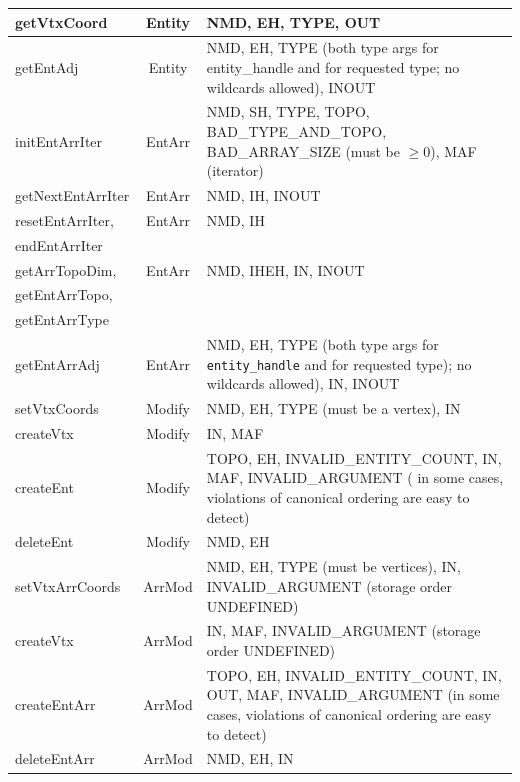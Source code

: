 \documentclass{article}
\begin{document}
\begin{longtable}{|l|c|p{3in}|}
getVtxCoord& Entity& NMD, EH, TYPE, OUT\\
\hline

getEntAdj & Entity& NMD, EH, TYPE (both type args for entity\_handle and for requested 
type; no wildcards allowed), INOUT\\
\hline

initEntArrIter& EntArr& NMD, SH, TYPE, TOPO, BAD\_TYPE\_AND\_TOPO, BAD\_ARRAY\_SIZE (must 
be $\ge 0$), MAF (iterator)\\
\hline

getNextEntArrIter& EntArr& NMD, IH, INOUT\\
\hline

resetEntArrIter, & EntArr&NMD, IH\\
endEntArrIter& &\\ 
\hline

getArrTopoDim,&  EntArr& NMD, IHEH, IN, INOUT\\
getEntArrTopo,& &\\
getEntArrType& &\\ 
\hline
  
getEntArrAdj & EntArr& NMD, EH, TYPE (both type args for {\tt entity\_handle} and for requested 
type); no wildcards allowed), IN, INOUT\\
\hline

setVtxCoords& Modify& NMD, EH, TYPE (must be a vertex), IN\\
\hline

createVtx& Modify& IN, MAF\\
\hline

createEnt& Modify& TOPO, EH, INVALID\_ENTITY\_COUNT, IN, MAF, INVALID\_ARGUMENT ( in 
some cases, violations of canonical ordering are easy to detect)\\
\hline

deleteEnt& Modify& NMD, EH\\
\hline

setVtxArrCoords& ArrMod& NMD, EH, TYPE (must be vertices), IN, INVALID\_ARGUMENT (storage 
order UNDEFINED)\\
\hline

createVtx& ArrMod& IN, MAF, INVALID\_ARGUMENT (storage order UNDEFINED)\\
\hline

createEntArr& ArrMod& TOPO, EH, INVALID\_ENTITY\_COUNT, IN, OUT, MAF, INVALID\_ARGUMENT 
(in some cases, violations of canonical ordering are easy to detect)\\
\hline

deleteEntArr& ArrMod& NMD, EH, IN\\
\hline
\end{longtable}
\end{document}
